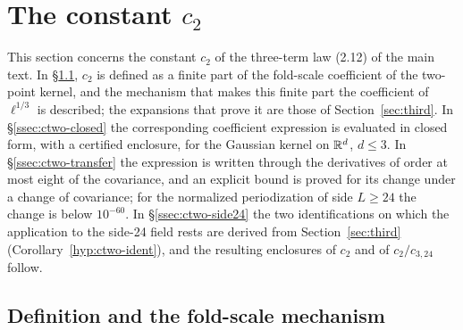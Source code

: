 \section{The constant \texorpdfstring{$c_2$}{c2}}\label{sec:ctwo}

This section concerns the constant $c_2$ of the three-term law (2.12) of the main text. In \S\ref{ssec:ctwo-def}, $c_2$ is defined as a finite part of the fold-scale coefficient of the two-point kernel, and the mechanism that makes this finite part the coefficient of $\ell^{1/3}$ is described; the expansions that prove it are those of Section~\ref{sec:third}. In \S\ref{ssec:ctwo-closed} the corresponding coefficient expression is evaluated in closed form, with a certified enclosure, for the Gaussian kernel on $\mathbb R^d$, $d\le3$. In \S\ref{ssec:ctwo-transfer} the expression is written through the derivatives of order at most eight of the covariance, and an explicit bound is proved for its change under a change of covariance; for the normalized periodization of side $L\ge24$ the change is below $10^{-60}$. In \S\ref{ssec:ctwo-side24} the two identifications on which the application to the side-24 field rests are derived from Section~\ref{sec:third} (Corollary~\ref{hyp:ctwo-ident}), and the resulting enclosures of $c_2$ and of $c_2/c_{3,24}$ follow.

\subsection{Definition and the fold-scale mechanism}\label{ssec:ctwo-def}

